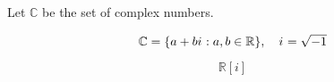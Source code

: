 \documentclass{article}
\theoremstyle{definition}
\theoremstyle{definition}
\newcommand{\iu}{{i\mkern1mu}}
\begin{document}
Let $\mathbb{C}$ be the set of complex numbers.

$$
\mathbb{C} = \{ a + b \iu : a, b \in \mathbb{R} \}, \quad \iu = \sqrt{-1}
$$

$$
\mathbb{R}[i]
$$
\end{document}
